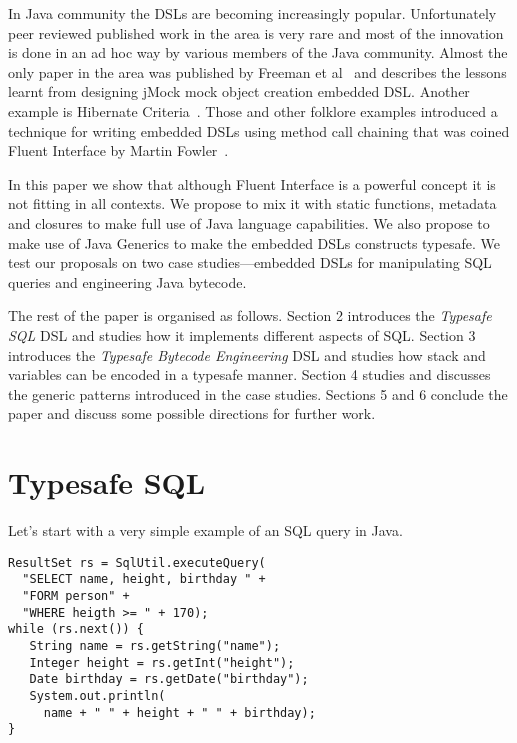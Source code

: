 \documentclass{sig-alternate}
\begin{document}
In Java community the DSLs are becoming increasingly popular. Unfortunately peer reviewed published work in the area is very rare and most of the innovation is done in an ad hoc way by various members of the Java community. Almost the only paper in the area was published by Freeman et al~\cite{freeman2004jsr} and describes the lessons learnt from designing jMock mock object creation embedded DSL. Another example is Hibernate Criteria~\cite{bauer2005ha}. Those and other folklore examples introduced a technique for writing embedded DSLs using method call chaining that was coined Fluent Interface by Martin Fowler~\cite{fowler2005}.

In this paper we show that although Fluent Interface is a powerful concept it is not fitting in all contexts. We propose to mix it with static functions, metadata and closures to make full use of Java language capabilities. We also propose to make use of Java Generics to make the embedded DSLs constructs typesafe. We test our proposals on two case studies---embedded DSLs for manipulating SQL queries and engineering Java bytecode.

The rest of the paper is organised as follows. Section 2 introduces the \emph{Typesafe SQL} DSL and studies how it implements different aspects of SQL. Section 3 introduces the \emph{Typesafe Bytecode Engineering} DSL and studies how stack and variables can be encoded in a typesafe manner. Section 4 studies and discusses the generic patterns introduced in the case studies. Sections 5 and 6 conclude the paper and discuss some possible directions for further work.

\section{Typesafe SQL}

Let's start with a very simple example of an SQL query in Java. 
\begin{verbatim}
ResultSet rs = SqlUtil.executeQuery(
  "SELECT name, height, birthday " + 
  "FORM person" +
  "WHERE heigth >= " + 170);
while (rs.next()) {
   String name = rs.getString("name");
   Integer height = rs.getInt("height");
   Date birthday = rs.getDate("birthday");
   System.out.println(
     name + " " + height + " " + birthday);
}
\end{verbatim}
\end{document}
